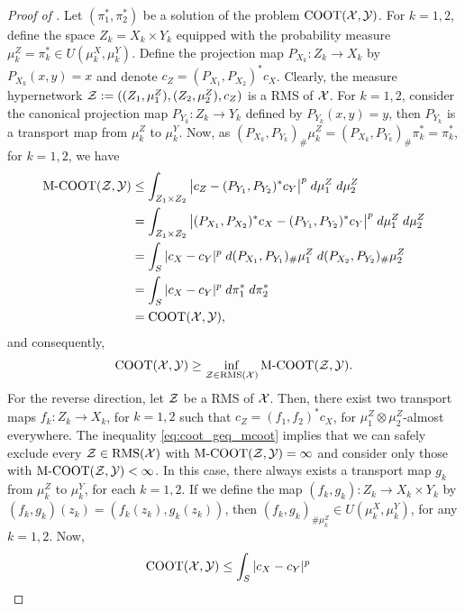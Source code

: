 \begin{proof}[Proof of ]
  Let $(\pi_1^*, \pi_2^*)$ be a solution of the problem $\text{COOT}(\mathcal X, \mathcal Y)$.
  For $k=1,2$, define the space $Z_k = X_k \times Y_k$
  equipped with the probability measure $\mu_k^Z = \pi_k^* \in U(\mu_k^X, \mu_k^Y)$.
  Define the projection map $P_{X_k}: Z_k \to X_k$ by $P_{X_k}(x,y) = x$ and denote
  $c_Z = (P_{X_1}, P_{X_2})^*c_X$. Clearly, the measure hypernetwork
  $\mathcal Z := ((Z_1, \mu_1^Z), (Z_2, \mu_2^Z), c_Z)$ is a RMS of $\mathcal X$. For
  $k=1,2$, consider the canonical projection map $P_{Y_k}: Z_k \to Y_k$ defined by $P_{Y_k}(x,y) = y$,
  then $P_{Y_k}$ is a transport map from $\mu_k^Z$ to $\mu_k^Y$. Now, as
  $(P_{X_k}, P_{Y_k})_{\#} \mu_k^Z = (P_{X_k}, P_{Y_k})_{\#} \pi_k^* = \pi_k^*$,
  for $k=1,2$, we have
  \begin{align}
    \text{M-COOT}(\mathcal Z, \mathcal Y) &\leq \int_{Z_1 \times Z_2}
    \big\vert c_Z - (P_{Y_1}, P_{Y_2})^*c_Y \big\vert^p \; d\mu_1^Z \; d\mu_2^Z \\
    &= \int_{Z_1 \times Z_2}
    \big\vert (P_{X_1}, P_{X_2})^*c_X - (P_{Y_1}, P_{Y_2})^*c_Y \big\vert^p
    \; d\mu_1^Z \; d\mu_2^Z \\
    &= \int_{S} \vert c_X - c_Y \vert^p
    \; d(P_{X_1}, P_{Y_1})_{\#} \mu_1^Z \; d(P_{X_2}, P_{Y_2})_{\#} \mu_2^Z \\
    &= \int_{S} \vert c_X - c_Y \vert^p \; d\pi_1^* \; d\pi_2^* \\
    &= \text{COOT}(\mathcal X, \mathcal Y),
  \end{align}
  and consequently,
  \begin{equation}
    \label{eq:coot_geq_mcoot}
    \text{COOT}(\mathcal X, \mathcal Y) \geq \inf_{\mathcal Z \in \text{RMS}(\mathcal X)} \text{M-COOT}(\mathcal Z, \mathcal Y).
  \end{equation}
  For the reverse direction, let $\mathcal Z$ be a RMS of $\mathcal X$. Then,
  there exist two transport maps $f_k : Z_k \to X_k$, for $k=1,2$ such that $c_Z = (f_1, f_2)^*c_X$,
  for $\mu_1^Z \otimes \mu_2^Z$-almost everywhere.
  The inequality \eqref{eq:coot_geq_mcoot} implies that we can safely exclude every
  $\mathcal Z \in \text{RMS}(\mathcal X)$ with $\text{M-COOT}(\mathcal Z, \mathcal Y) = \infty$ and consider only those with
  $\text{M-COOT}(\mathcal Z, \mathcal Y) < \infty$. In this case, there always exists a transport map
  $g_k$ from $\mu_k^Z$ to $\mu_k^Y$, for each $k=1,2$. If we define the map
  $(f_k, g_k): Z_k \to X_k \times Y_k$ by $(f_k,g_k)(z_k) = (f_k(z_k), g_k(z_k))$,
  then $(f_k,g_k)_{\# \mu_k^Z} \in U(\mu_k^X, \mu_k^Y)$, for any $k=1,2$. Now,
  \begin{align}
    \coot(\cX, \cY) &\leq \int_{S} \vert c_X - c_Y \vert^p

\end{align}
\end{proof}
